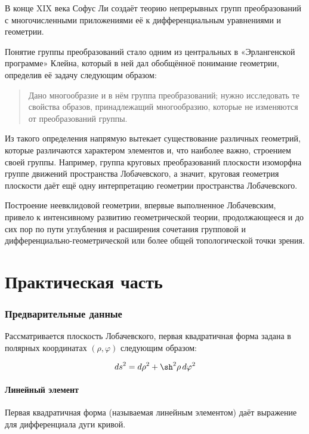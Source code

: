 \documentclass{article}
\numberwithin{equation}{section}
\renewcommand{\phi}{\varphi}
\begin{document}


В конце XIX века Софус Ли создаёт теорию непрерывных групп
преобразований с многочисленными приложениями её к дифференциальным
уравнениями и геометрии.

Понятие группы преобразований стало одним из центральных в
«Эрлангенской программе» Клейна, который в ней дал обобщённоё
понимание геометрии, определив её задачу следующим образом:

\begin{quote}
  Дано многообразие и в нём группа преобразований; нужно исследовать
  те свойства образов, принадлежащий многообразию, которые не
  изменяются от преобразований группы.
\end{quote}

Из такого определения напрямую вытекает существование различных
геометрий, которые различаются характером элементов и, что наиболее
важно, строением своей группы. Например, группа круговых
преобразований плоскости изоморфна группе движений пространства
Лобачевского, а значит, круговая геометрия плоскости даёт ещё одну
интерпретацию геометрии пространства Лобачевского.

Построение неевклидовой геометрии, впервые выполненное Лобачевским,
привело к интенсивному развитию геометрической теории, продолжающееся
и до сих пор по пути углубления и расширения сочетания групповой и
дифференциально-геометрической или более общей топологической точки
зрения.

\clearpage
\part{Практическая часть}

\section{Предварительные данные}
Рассматривается плоскость Лобачевского, первая квадратичная форма
задана в полярных координатах $(\rho, \phi)$ следующим образом:

\begin{equation}\label{eq:lin-elt}
  {ds}^2 = d\rho^2+\sh^2{\rho}\,d\phi^2
\end{equation}

\subsection{Линейный элемент}

Первая квадратичная форма (называемая линейным элементом) даёт
выражение для дифференциала дуги кривой.
\end{document}
